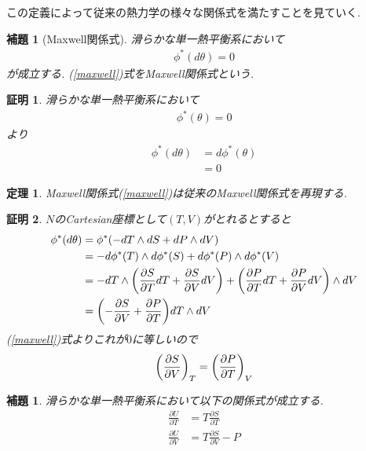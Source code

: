 \documentclass[a4paper,12pt]{ltjsarticle}
\theoremstyle{break}
\newtheorem{thrm}[thm]{定理}
\newtheorem{lem}[thm]{補題}
\newtheorem*{prf}{証明}
\newcommand{\ddel}[2]{\frac{\partial{#1}}{\partial{#2}}}
\numberwithin{equation}{section}
\begin{document}
この定義によって従来の熱力学の様々な関係式を満たすことを見ていく. 

\begin{lem}[Maxwell関係式]
  滑らかな単一熱平衡系において
  \begin{align}
    \label{maxwell}
    \phi^*(d\theta)
    = 0
  \end{align}
  が成立する.  
  (\ref{maxwell})式をMaxwell関係式という.
\end{lem}  

\begin{prf}
  滑らかな単一熱平衡系において
  \begin{align*}
    \phi^*(\theta)
    = 0
  \end{align*}
  より
  \begin{align*}
    \phi^*(d\theta) 
    &= d \phi^*(\theta) \\
    &= 0
  \end{align*}
\end{prf}

\begin{thrm}
  Maxwell関係式(\ref{maxwell})は従来のMaxwell関係式を再現する. 
\end{thrm}

\begin{prf}
  $N$のCartesian座標として$(T,V)$がとれるとすると
  \begin{align*}
    \phi^*(d\theta) 
    &= \phi^*(-dT \wedge dS + dP \wedge dV) \\
    &= -d\phi^*(T) \wedge d\phi^*(S) + d\phi^*(P) \wedge d\phi^*(V) \\
    &= -dT \wedge \qty(\ddel{S}{T} dT + \ddel{S}{V} dV) + \qty(\ddel{P}{T} dT + \ddel{P}{V} dV) \wedge dV \\
    &= \qty(-\ddel{S}{V} + \ddel{P}{T}) dT \wedge dV \\
  \end{align*}
  (\ref{maxwell})式よりこれが$0$に等しいので
  \begin{align}
    \label{maxwell1}
    \qty(\ddel{S}{V})_T 
    = \qty(\ddel{P}{T})_V
  \end{align}
\end{prf}

\begin{lem}
  滑らかな単一熱平衡系において以下の関係式が成立する. 
  \begin{align}
    \label{ene1}
    \ddel{U}{T} &= T \ddel{S}{T} \\
    \label{ene2}
    \ddel{U}{V} &= T\ddel{S}{V} - P 
  \end{align}
\end{lem}  
\end{document}
